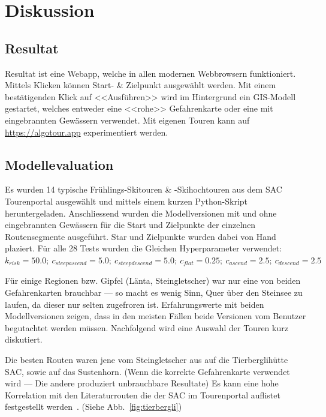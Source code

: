 \section{Diskussion}
\subsection{Resultat}

Resultat ist eine Webapp, welche in allen modernen Webbrowsern funktioniert. Mittels Klicken können Start- \& Zielpunkt ausgewählt werden. Mit einem bestätigenden Klick auf <<Ausführen>> wird im Hintergrund ein GIS-Modell gestartet, welches entweder eine <<rohe>> Gefahrenkarte oder eine mit eingebrannten Gewässern verwendet. Mit eigenen Touren kann auf \url{https://algotour.app} experimentiert werden.

\subsection{Modellevaluation}

Es wurden 14 typische Frühlings-Skitouren \& -Skihochtouren aus dem SAC Tourenportal ausgewählt und mittels einem kurzen Python-Skript heruntergeladen. Anschliessend wurden die Modellversionen mit und ohne eingebrannten Gewässern für die Start und Zielpunkte der einzelnen Routensegmente ausgeführt. Star und Zielpunkte wurden dabei von Hand plaziert. Für alle 28 Tests wurden die Gleichen Hyperparameter verwendet: $k_{risk}={50.0};\ c_{steepascend}={5.0};\ c_{steepdescend}={5.0};\ c_{flat}={0.25};\ c_{ascend}={2.5};\ c_{descend}={2.5}$

Für einige Regionen bzw. Gipfel (Länta, Steingletscher) war nur eine von beiden Gefahrenkarten brauchbar --- so macht es wenig Sinn, Quer über den Steinsee zu laufen, da dieser nur selten zugefroren ist. Erfahrungswerte mit beiden Modellversionen zeigen, dass in den meisten Fällen beide Versionen vom Benutzer begutachtet werden müssen.
Nachfolgend wird eine Auswahl der Touren kurz diskutiert.

Die besten Routen waren jene vom Steingletscher aus auf die Tierberglihütte SAC, sowie auf das Sustenhorn. (Wenn die korrekte Gefahrenkarte verwendet wird --- Die andere produziert unbrauchbare Resultate) Es kann eine hohe Korrelation mit den Literaturrouten die der SAC im Tourenportal auflistet festgestellt werden~\cite{mmzentralch}. (Siehe Abb.\ \ref{fig:tierbergli})

